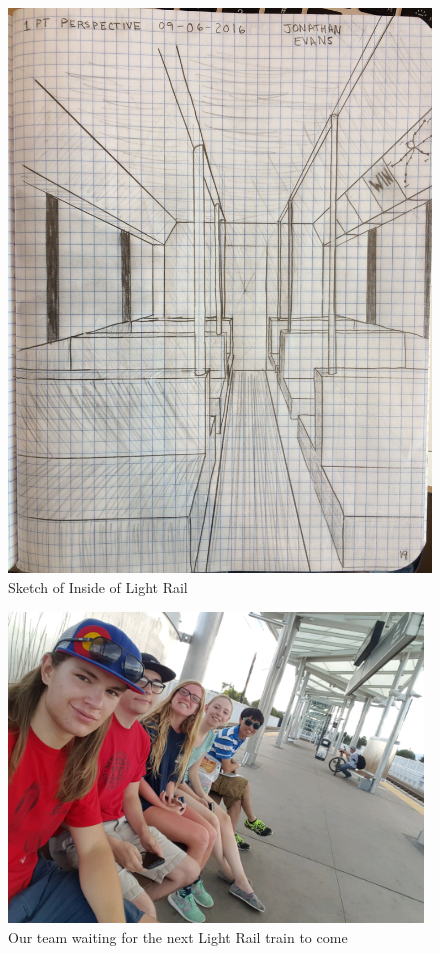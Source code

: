 \documentclass[11pt]{article}
\begin{document}
\pagebreak
\begin{figure}[H]
    \centering
    \includegraphics[width=160mm]{resources/light-rail-sketch.jpg}
    \caption{Sketch of Inside of Light Rail}
\end{figure}

\begin{figure}[H]
    \centering
    \includegraphics[width=110mm]{resources/team.png}
    \caption{Our team waiting for the next Light Rail train to come}
\end{figure}
\end{document}
